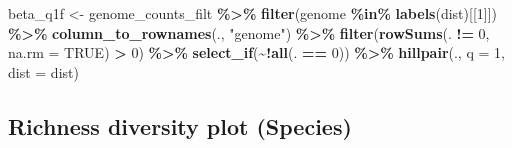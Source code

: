\documentclass[
]{book}
\newenvironment{Shaded}{\begin{snugshade}}{\end{snugshade}}
\newcommand{\AttributeTok}[1]{\textcolor[rgb]{0.13,0.29,0.53}{#1}}
\newcommand{\ConstantTok}[1]{\textcolor[rgb]{0.56,0.35,0.01}{#1}}
\newcommand{\DecValTok}[1]{\textcolor[rgb]{0.00,0.00,0.81}{#1}}
\newcommand{\FunctionTok}[1]{\textcolor[rgb]{0.13,0.29,0.53}{\textbf{#1}}}
\newcommand{\NormalTok}[1]{#1}
\newcommand{\OtherTok}[1]{\textcolor[rgb]{0.56,0.35,0.01}{#1}}
\newcommand{\SpecialCharTok}[1]{\textcolor[rgb]{0.81,0.36,0.00}{\textbf{#1}}}
\newcommand{\StringTok}[1]{\textcolor[rgb]{0.31,0.60,0.02}{#1}}
\begin{document}
\begin{Shaded}
\begin{Highlighting}[]
\NormalTok{beta\_q1f }\OtherTok{\textless{}{-}}\NormalTok{ genome\_counts\_filt }\SpecialCharTok{\%\textgreater{}\%}
  \FunctionTok{filter}\NormalTok{(genome }\SpecialCharTok{\%in\%} \FunctionTok{labels}\NormalTok{(dist)[[}\DecValTok{1}\NormalTok{]]) }\SpecialCharTok{\%\textgreater{}\%}
  \FunctionTok{column\_to\_rownames}\NormalTok{(., }\StringTok{"genome"}\NormalTok{) }\SpecialCharTok{\%\textgreater{}\%} 
  \FunctionTok{filter}\NormalTok{(}\FunctionTok{rowSums}\NormalTok{(. }\SpecialCharTok{!=} \DecValTok{0}\NormalTok{, }\AttributeTok{na.rm =} \ConstantTok{TRUE}\NormalTok{) }\SpecialCharTok{\textgreater{}} \DecValTok{0}\NormalTok{) }\SpecialCharTok{\%\textgreater{}\%}
  \FunctionTok{select\_if}\NormalTok{(}\SpecialCharTok{\textasciitilde{}!}\FunctionTok{all}\NormalTok{(. }\SpecialCharTok{==} \DecValTok{0}\NormalTok{)) }\SpecialCharTok{\%\textgreater{}\%}
  \FunctionTok{hillpair}\NormalTok{(., }\AttributeTok{q =} \DecValTok{1}\NormalTok{, }\AttributeTok{dist =}\NormalTok{ dist)}
\end{Highlighting}
\end{Shaded}

\subsection{Richness diversity plot
(Species)}\label{richness-diversity-plot-species}
\end{document}
